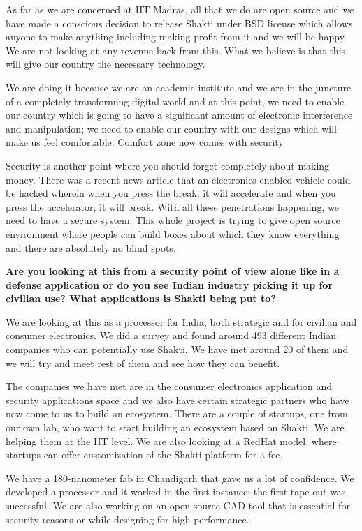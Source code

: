 \begin{multicols}{2}
As far as we are concerned at IIT Madras, all that we do are open source and we have made a conscious decision to release Shakti under BSD license which allows anyone to make anything including making profit from it and we will be happy. We are not looking at any revenue back from this. What we believe is that this will give our country the necessary technology.

We are doing it because we are an academic institute and we are in the juncture of a completely transforming digital world and at this point, we need to enable our country which is going to have a significant amount of electronic interference and manipulation; we need to enable our country with our designs which will make us feel comfortable. Comfort zone now comes with security.

Security is another point where you should forget completely about making money. There was a recent news article that an electronics-enabled vehicle could be hacked wherein when you press the break, it will accelerate and when you press the accelerator, it will break. With all these penetrations happening, we need to have a secure system. This whole project is trying to give open source environment where people can build boxes about which they know everything and there are absolutely no blind spots.
\smallskip

{\bf Are you looking at this from a security point of view alone like in a defense application or do you see Indian industry picking it up for civilian use? What applications is Shakti being put to?}

We are looking at this as a processor for India, both strategic and for civilian and consumer electronics. We did a survey and found around 493 different Indian companies who can potentially use Shakti. We have met around 20 of them and we will try and meet rest of them and see how they can benefit.

The companies we have met are in the consumer electronics application and security applications space and we also have certain strategic partners who have now come to us to build an ecosystem. There are a couple of startups, one from our own lab, who want to start building an ecosystem based on Shakti. We are helping them at the IIT level. We are also looking at a RedHat model, where startups can offer customization of the Shakti platform for a fee.

We have a 180-nanometer fab in Chandigarh that gave us a lot of confidence. We developed a processor and it worked in the first instance; the first tape-out was successful. We are also working on an open source CAD tool that is essential for security reasons or while designing for high performance.
\smallskip


\end{multicols}
